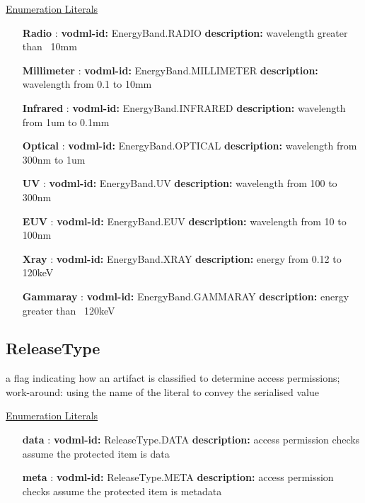   \noindent \underline{Enumeration Literals}
  \vspace{-\parsep}
  \small
  \begin{itemize}
  
    \item[\textbf{Radio}]: \textbf{vodml-id:} EnergyBand.RADIO \newline
          \textbf{description:} wavelength greater than ~10mm
    \item[\textbf{Millimeter}]: \textbf{vodml-id:} EnergyBand.MILLIMETER \newline
          \textbf{description:} wavelength from 0.1 to 10mm
    \item[\textbf{Infrared}]: \textbf{vodml-id:} EnergyBand.INFRARED \newline
          \textbf{description:} wavelength from 1um to 0.1mm
    \item[\textbf{Optical}]: \textbf{vodml-id:} EnergyBand.OPTICAL \newline
          \textbf{description:} wavelength from 300nm to 1um
    \item[\textbf{UV}]: \textbf{vodml-id:} EnergyBand.UV \newline
          \textbf{description:} wavelength from 100 to 300nm
    \item[\textbf{EUV}]: \textbf{vodml-id:} EnergyBand.EUV \newline
          \textbf{description:} wavelength from 10 to 100nm
    \item[\textbf{Xray}]: \textbf{vodml-id:} EnergyBand.XRAY \newline
          \textbf{description:} energy from 0.12 to 120keV
    \item[\textbf{Gammaray}]: \textbf{vodml-id:} EnergyBand.GAMMARAY \newline
          \textbf{description:} energy greater than ~120keV
  \end{itemize}
  \normalsize


  \subsection{ReleaseType}
  \label{sect:ReleaseType}

  a flag indicating how an artifact is classified to determine access permissions; work-around: using the name of the literal to convey the serialised value

  \noindent \underline{Enumeration Literals}
  \vspace{-\parsep}
  \small
  \begin{itemize}
  
    \item[\textbf{data}]: \textbf{vodml-id:} ReleaseType.DATA \newline
          \textbf{description:} access permission checks assume the protected item is data
    \item[\textbf{meta}]: \textbf{vodml-id:} ReleaseType.META \newline
          \textbf{description:} access permission checks assume the protected item is metadata
  \end{itemize}
  \normalsize


